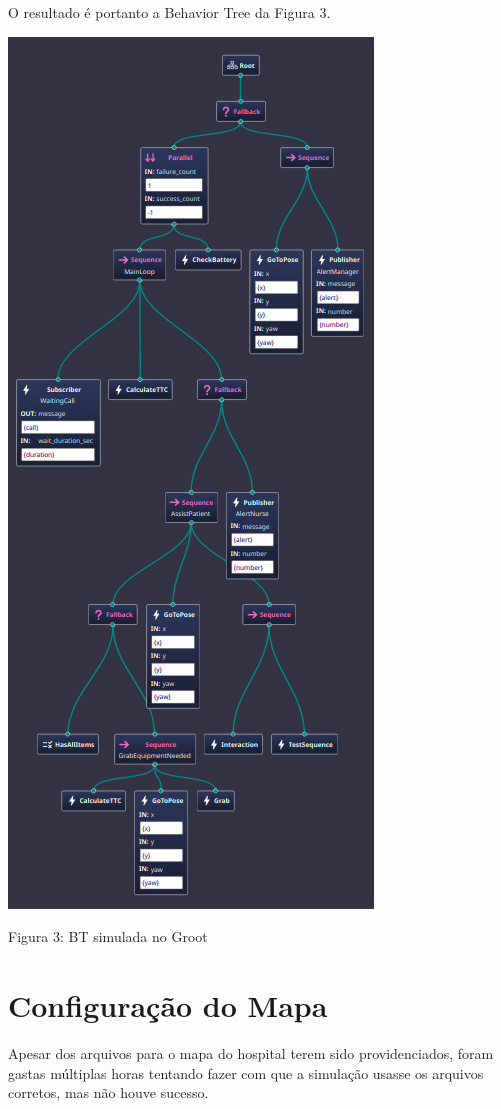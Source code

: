 \documentclass[a4 paper]{article}
\newcommand{\parag}{\hspace{30pt}}
\begin{document}
O resultado é portanto a Behavior Tree da Figura 3.

\newpage
\begin{table}[h]
\centering
\includegraphics[scale=0.5]{figuras/bt}
\end{table}
\begin{center}
Figura 3: BT simulada no Groot
\end{center}

\section{Configuração do Mapa}
\parag Apesar dos arquivos para o mapa do hospital terem sido providenciados, foram gastas múltiplas horas tentando fazer com que a simulação usasse os arquivos corretos, mas não houve sucesso. 
\end{document}
